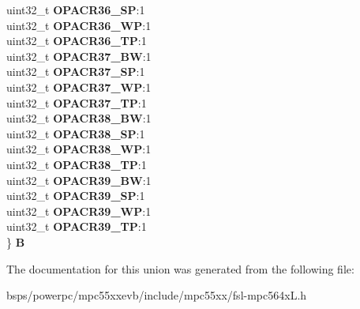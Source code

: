 \begin{DoxyCompactItemize}
\begin{tabbing}
\>uint32\_t {\bfseries OPACR36\_SP}:1\\
\>uint32\_t {\bfseries OPACR36\_WP}:1\\
\>uint32\_t {\bfseries OPACR36\_TP}:1\\
\>uint32\_t {\bfseries OPACR37\_BW}:1\\
\>uint32\_t {\bfseries OPACR37\_SP}:1\\
\>uint32\_t {\bfseries OPACR37\_WP}:1\\
\>uint32\_t {\bfseries OPACR37\_TP}:1\\
\>uint32\_t {\bfseries OPACR38\_BW}:1\\
\>uint32\_t {\bfseries OPACR38\_SP}:1\\
\>uint32\_t {\bfseries OPACR38\_WP}:1\\
\>uint32\_t {\bfseries OPACR38\_TP}:1\\
\>uint32\_t {\bfseries OPACR39\_BW}:1\\
\>uint32\_t {\bfseries OPACR39\_SP}:1\\
\>uint32\_t {\bfseries OPACR39\_WP}:1\\
\>uint32\_t {\bfseries OPACR39\_TP}:1\\
\} {\bfseries B}\\

\end{tabbing}\end{DoxyCompactItemize}


The documentation for this union was generated from the following file\+:\begin{DoxyCompactItemize}
\item 
bsps/powerpc/mpc55xxevb/include/mpc55xx/fsl-\/mpc564x\+L.\+h\end{DoxyCompactItemize}
